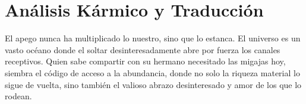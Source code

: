 \section{Análisis Kármico y Traducción}
\begin{figure}
  \vspace{-1.5em}
  \begin{center}
  \end{center}
  \vspace{-1.5em}
\end{figure}
El apego nunca ha multiplicado lo nuestro, sino que lo estanca. El universo es un vasto océano donde el soltar desinteresadamente abre por fuerza los canales receptivos. Quien sabe compartir con su hermano necesitado las migajas hoy, siembra el código de acceso a la abundancia, donde no solo la riqueza material lo sigue de vuelta, sino también el valioso abrazo desinteresado y amor de los que lo rodean.

